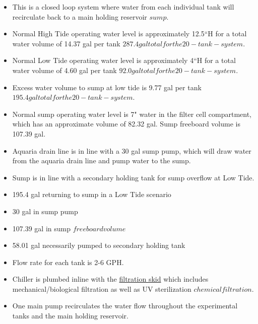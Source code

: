 \documentclass[]{book}
\providecommand{\tightlist}{%
  \setlength{\itemsep}{0pt}\setlength{\parskip}{0pt}}
\begin{document}
\begin{itemize}
\tightlist
\item
  This is a closed loop system where water from each individual tank
  will recirculate back to a main holding reservoir \(sump\).\\
\item
  Normal High Tide operating water level is approximately 12.5``H for a
  total water volume of 14.37 gal per tank
  \(287.4 gal total for the 20-tank-system\).\\
\item
  Normal Low Tide operating water level is approximately 4``H for a
  total water volume of 4.60 gal per tank
  \(92.0 gal total for the 20-tank-system\).\\
\item
  Excess water volume to sump at low tide is 9.77 gal per tank
  \(195.4 gal total for the 20-tank-system\).\\
\item
  Normal sump operating water level is 7" water in the filter cell
  compartment, which has an approximate volume of 82.32 gal. Sump
  freeboard volume is 107.39 gal.\\
\item
  Aquaria drain line is in line with a 30 gal sump pump, which will draw
  water from the aquaria drain line and pump water to the sump.
\item
  Sump is in line with a secondary holding tank for sump overflow at Low
  Tide.
\item
  195.4 gal returning to sump in a Low Tide scenario
\item
  30 gal in sump pump
\item
  107.39 gal in sump \(freeboard volume\)
\item
  58.01 gal necessarily pumped to secondary holding tank
\item
  Flow rate for each tank is 2-6 GPH.\\
\item
  Chiller is plumbed inline with the
  \href{https://github.com/SilbigerLab/Mesocosm_User_Manual/tree/394a3f7d9fed8765e4152f9fdd11d00a2ea87a93/Manuals/Filtration_Skid_Build_Package.pdf}{filtration
  skid} which includes mechanical/biological filtration as well as UV
  sterilization \(chemical filtration\).\\
\item
  One main pump recirculates the water flow throughout the experimental
  tanks and the main holding reservoir.\\

\end{itemize}
\end{document}
